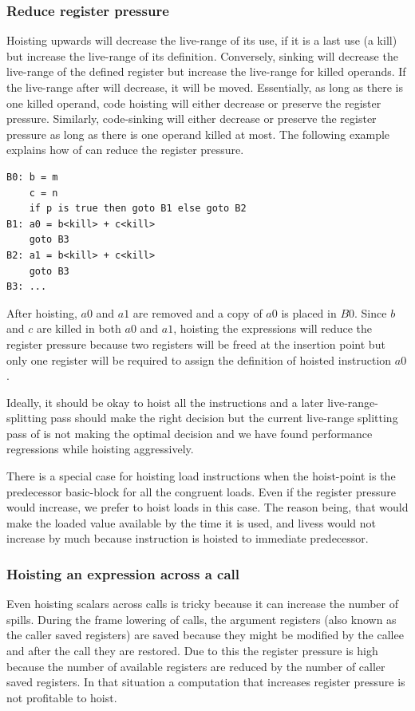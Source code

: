 \documentclass[sigplan,10pt,review,anonymous]{acmart}\settopmatter{printfolios=true,printccs=false,printacmref=false}
\begin{document}
\subsubsection{Reduce register pressure}
\label{hoist:reg-pressure}
Hoisting upwards will decrease the live-range of its use, if it is a last use (a
kill) but increase the live-range of its definition. Conversely, sinking will
decrease the live-range of the defined register but increase the live-range for
killed operands. If the live-range after \GCM{} will decrease, it will be
moved. Essentially, as long as there is one killed operand, code hoisting will
either decrease or preserve the register pressure.  Similarly, code-sinking will
either decrease or preserve the register pressure as long as there is one
operand killed at most.  The following example explains how \GCM{} of can reduce
the register pressure.

\begin{verbatim}
B0: b = m
    c = n
    if p is true then goto B1 else goto B2
B1: a0 = b<kill> + c<kill>
    goto B3
B2: a1 = b<kill> + c<kill>
    goto B3
B3: ...
\end{verbatim}

After hoisting, $a0$ and $a1$ are removed and a copy of $a0$ is placed in
$B0$. Since $b$ and $c$ are killed in both $a0$ and $a1$, hoisting the
expressions will reduce the register pressure because two registers will be
freed at the insertion point but only one register will be required to assign
the definition of hoisted instruction $a0$.

Ideally, it should be okay to hoist all the instructions and a later
live-range-splitting \cite{cooper1998live} pass should make the right decision
but the current live-range splitting pass of \LLVM{} is not making the optimal
decision and we have found performance regressions while hoisting aggressively.

There is a special case for hoisting load instructions when the hoist-point is
the predecessor basic-block for all the congruent loads. Even if the register
pressure would increase, we prefer to hoist loads in this case. The reason
being, that would make the loaded value available by the time it is used, and
livess would not increase by much because instruction is hoisted to immediate
predecessor.


\subsubsection{Hoisting an expression across a call}
\label{cost:across-calls}
Even hoisting scalars across calls is tricky because it can increase the number
of spills. During the frame lowering of calls, the argument registers (also
known as the caller saved registers) are saved because they might be modified by
the callee and after the call they are restored. Due to this the register
pressure is high because the number of available registers are reduced by the
number of caller saved registers. In that situation a computation that increases
register pressure is not profitable to hoist.
\end{document}
